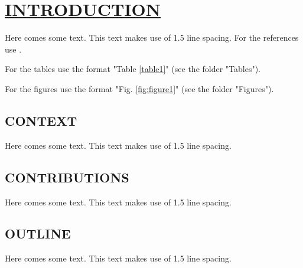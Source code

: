 \section{\uline{INTRODUCTION}}
Here comes some text. This text makes use of 1.5 line spacing. For the references use \cite{gasparyan2020automated}. 

For the tables use the format "Table \ref{table1}" (see the folder "Tables").


For the figures use the format "Fig. \ref{fig:figure1}" (see the folder "Figures").


\subsection{CONTEXT}
Here comes some text. This text makes use of 1.5 line spacing. 
\subsection{CONTRIBUTIONS}
Here comes some text. This text makes use of 1.5 line spacing. 
\subsection{OUTLINE}
Here comes some text. This text makes use of 1.5 line spacing. 